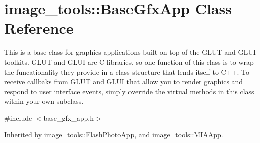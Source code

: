 \hypertarget{classimage__tools_1_1BaseGfxApp}{}\section{image\+\_\+tools\+:\+:Base\+Gfx\+App Class Reference}
\label{classimage__tools_1_1BaseGfxApp}


This is a base class for graphics applications built on top of the G\+L\+UT and G\+L\+UI toolkits. G\+L\+UT and G\+L\+UI are C libraries, so one function of this class is to wrap the funcationality they provide in a class structure that lends itself to C++. To receive callbaks from G\+L\+UT and G\+L\+UI that allow you to render graphics and respond to user interface events, simply override the virtual methods in this class within your own subclass.  




{\ttfamily \#include $<$base\+\_\+gfx\+\_\+app.\+h$>$}



Inherited by \hyperlink{classimage__tools_1_1FlashPhotoApp}{image\+\_\+tools\+::\+Flash\+Photo\+App}, and \hyperlink{classimage__tools_1_1MIAApp}{image\+\_\+tools\+::\+M\+I\+A\+App}.


